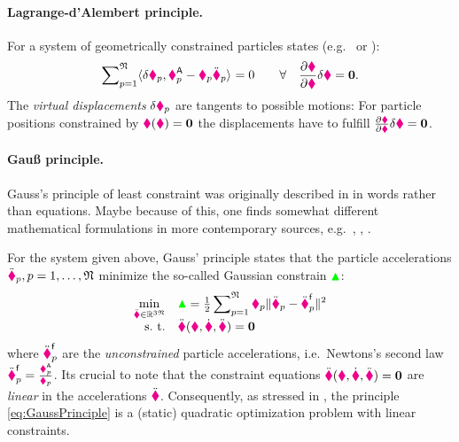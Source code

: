 \paragraph{Lagrange-d'Alembert principle.} 
For a system of geometrically constrained particles states (e.g.\ \cite[sec.\,1.4]{Goldstein:ClassicalMechanics} or \cite[sec.\,6.3]{Lurie:AnalyticalMechanics}):
\begin{align}\label{eq:DAlembertPrinciple}
 \sumParticlesFull \sProd{\delta \particlePos{\PidxI}}{\particleForceImpressed{\PidxI} - \particleMass{\PidxI}\particlePosdd{\PidxI}} = 0 
\qquad \forall \quad \pdiff[\particleGeoConstraint]{\particleCoord} \delta\particleCoord = \tuple{0}.
\end{align}
The \textit{virtual displacements} $\delta \particlePos{\PidxI}$ are tangents to possible motions:
For particle positions constrained by $\particleGeoConstraint(\particleCoord) = \tuple{0}$ the displacements have to fulfill $\pdiff[\particleGeoConstraint]{\particleCoord} \delta\particleCoord = \tuple{0}$.

\paragraph{Gauß principle.}
Gauss's principle of least constraint was originally described in \cite{Gauss:Principle} in words rather than equations.
Maybe because of this, one finds somewhat different mathematical formulations in more contemporary sources, e.g.\ \cite[sec.\ 7]{Paesler:PrinzipeDerMechanik}, \cite[sec.\,IV.8]{Lanczos:Variational}, \cite[sec.\,2.2]{Bremer:ElasticMultibodyDynamics}. %

For the system given above, Gauss' principle states that the particle accelerations $\particlePosdd{\PidxI}, \PidxI=1,\ldots,\numParticles$ minimize the so-called Gaussian constrain $\GaussianConstraint$:
\begin{align}\label{eq:GaussPrinciple}
 \begin{array}{rl}
  \minOp[\particleCoorddd\in\RealNum^{3\numParticles}] & \GaussianConstraint = \tfrac{1}{2} \displaystyle\sumParticlesFull \particleMass{\PidxI} \norm{\particlePosdd{\PidxI} - \particlePosdd{\PidxI}^{\idxText{f}}}^2 \\
  \text{s.\ t.} & \ddot{\particleGeoConstraint}(\particleCoord, \particleCoordd, \particleCoorddd) = \tuple{0}
 \end{array}
\end{align}
where $\particlePosdd{\PidxI}^{\idxText{f}}$ are the \textit{unconstrained} particle accelerations, i.e.\ Newtons's second law $\particlePosdd{\PidxI}^{\idxText{f}}=\tfrac{\particleForceImpressed{\PidxI}}{\particleMass{\PidxI}}$.
Its crucial to note that the constraint equations $\ddot{\particleGeoConstraint}(\particleCoord, \particleCoordd, \particleCoorddd) = \tuple{0}$ are \textit{linear} in the accelerations $\particleCoorddd$.
Consequently, as stressed in \cite{Gauss:Principle}, the principle \eqref{eq:GaussPrinciple} is a (static) quadratic optimization problem with linear constraints.


